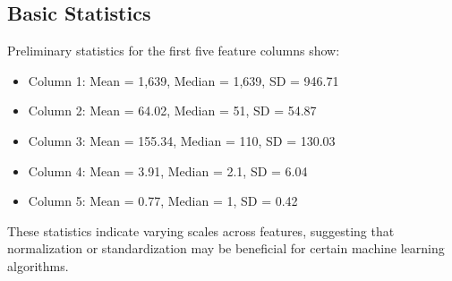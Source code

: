 \subsection{Basic Statistics}
Preliminary statistics for the first five feature columns show:
\begin{itemize}
    \item Column 1: Mean = 1,639, Median = 1,639, SD = 946.71
    \item Column 2: Mean = 64.02, Median = 51, SD = 54.87
    \item Column 3: Mean = 155.34, Median = 110, SD = 130.03
    \item Column 4: Mean = 3.91, Median = 2.1, SD = 6.04
    \item Column 5: Mean = 0.77, Median = 1, SD = 0.42
\end{itemize}

These statistics indicate varying scales across features, suggesting that normalization or standardization may be beneficial for certain machine learning algorithms.